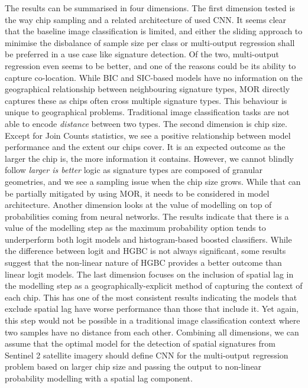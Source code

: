 The results can be summarised in four dimensions.
The first dimension tested is the way chip sampling and a related architecture of used
CNN. It seems clear that the baseline image classification is limited, and either the
sliding approach to minimise the disbalance of sample size per class or multi-output
regression shall be preferred in a use case like signature detection. Of the two,
multi-output regression even seems to be better, and one of the reasons could be its
ability to capture co-location. While BIC and SIC-based models have no information on
the geographical relationship between neighbouring signature types, MOR directly
captures these as chips often cross multiple signature types. This behaviour is unique
to geographical problems. Traditional image classification tasks are not able to encode
\textit{distance} between two types.
The second dimension is chip size. Except for Join Counts statistics, we see a positive
relationship between model performance and the extent our chips cover. It is an expected
outcome as the larger the chip is, the more information it contains. However, we cannot
blindly follow \textit{larger is better} logic as signature types are composed of
granular geometries, and we see a sampling issue when the chip size grows. While that
can be partially mitigated by using MOR, it needs to be considered in model
architecture.
Another dimension looks at the value of modelling on top of probabilities coming from
neural networks. The results indicate that there is a value of the modelling step as the
maximum probability option tends to underperform both logit models and histogram-based
boosted classifiers. While the difference between logit and HGBC is not always
significant, some results suggest that the non-linear nature of HGBC provides a better
outcome than linear logit models.
The last dimension focuses on the inclusion of spatial lag in the modelling step as a
geographically-explicit method of capturing the context of each chip. This has one of
the most consistent results indicating the models that exclude spatial lag have worse
performance than those that include it. Yet again, this step would not be possible in a
traditional image classification context where two samples have no distance from each
other.
Combining all dimensions, we can assume that the optimal model for the detection of spatial
signatures from Sentinel 2 satellite imagery should define CNN for the multi-output
regression problem based on larger chip size and passing the output to non-linear
probability modelling with a spatial lag component.

